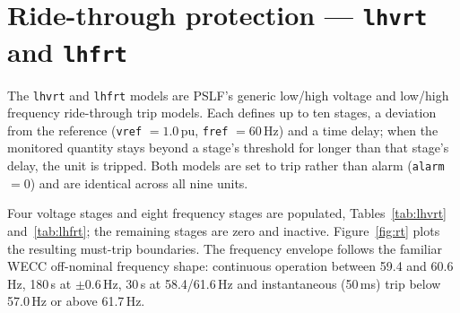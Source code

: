 \section{Ride-through protection --- \texttt{lhvrt} and \texttt{lhfrt}}
\label{sec:rt}

The \texttt{lhvrt} and \texttt{lhfrt} models are PSLF's generic low/high voltage and
low/high frequency ride-through trip models. Each defines up to ten stages, a
deviation from the reference (\texttt{vref} $= 1.0$\,pu, \texttt{fref} $= 60$\,Hz) and
a time delay; when the monitored quantity stays beyond a stage's threshold for
longer than that stage's delay, the unit is tripped. Both models are set to trip
rather than alarm (\texttt{alarm} $= 0$) and are identical across all nine units.

Four voltage stages and eight frequency stages are populated, Tables~\ref{tab:lhvrt}
and~\ref{tab:lhfrt}; the remaining stages are zero and inactive. Figure~\ref{fig:rt}
plots the resulting must-trip boundaries. The frequency envelope follows the familiar
WECC off-nominal frequency shape: continuous operation between 59.4 and 60.6\,Hz,
180\,s at $\pm0.6$\,Hz, 30\,s at 58.4/61.6\,Hz and instantaneous (50\,ms) trip below
57.0\,Hz or above 61.7\,Hz.

\begin{table}[!ht]
\centering

\caption{\texttt{lhvrt} voltage trip stages (\texttt{vref} $= 1.0$\,pu).}
\label{tab:lhvrt}
\end{table}

\begin{table}[!ht]
\centering

\caption{\texttt{lhfrt} frequency trip stages (\texttt{fref} $= 60$\,Hz).}
\label{tab:lhfrt}
\end{table}

